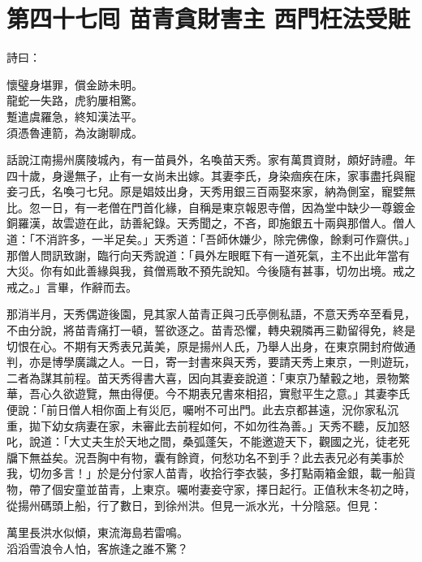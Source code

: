 
\chapter*{第四十七囘 苗青貪財害主 西門枉法受賍}


詩曰：

\begin{myquote}
懷璧身堪罪，償金跡未明。\\龍蛇一失路，虎豹屢相驚。\\蹔遣虞羅急，終知漢法平。\\須憑魯連箭，為汝謝聊成。
\end{myquote}

話說江南揚州廣陵城內，有一苗員外，名喚苗天秀。家有萬貫資財，頗好詩禮。年四十歲，身邊無子，止有一女尚未出嫁。其妻李氏，身染痼疾在床，家事盡托與寵妾刁氏，名喚刁七兒。原是娼妓出身，天秀用銀三百兩娶來家，納為側室，寵嬖無比。{}忽一日，有一老僧在門首化緣，自稱是東京報恩寺僧，因為堂中缺少一尊鍍金銅羅漢，故雲遊在此，訪善紀錄。天秀聞之，不吝，即施銀五十兩與那僧人。僧人道：「不消許多，一半足矣。」天秀道：「吾師休嫌少，除完佛像，餘剩可作齋供。」那僧人問訊致謝，臨行向天秀說道：「員外左眼眶下有一道死氣，主不出此年當有大災。你有如此善緣與我，貧僧焉敢不預先說知。今後隨有甚事，切勿出境。戒之戒之。」言畢，作辭而去。

那消半月，天秀偶遊後園，見其家人苗青正與刁氏亭側私語，不意天秀卒至看見，不由分說，將苗青痛打一頓，誓欲逐之。苗青恐懼，轉央親隣再三勸留得免，終是切恨在心。不期有天秀表兄黃美，原是揚州人氏，乃舉人出身，在東京開封府做通判，亦是博學廣識之人。一日，寄一封書來與天秀，要請天秀上東京，一則遊玩，二者為謀其前程。苗天秀得書大喜，因向其妻妾說道：「東京乃輦轂之地，景物繁華，吾心久欲遊覽，無由得便。今不期表兄書來相招，實慰平生之意。」其妻李氏便說：「前日僧人相你面上有災厄，囑咐不可出門。此去京都甚遠，況你家私沉重，拋下幼女病妻在家，未審此去前程如何，不如勿徃為善。」天秀不聽，反加怒叱，說道：「大丈夫生於天地之間，桑弧蓬矢，不能邀遊天下，觀國之光，徒老死牖下無益矣。況吾胸中有物，囊有餘資，何愁功名不到手？此去表兄必有美事於我，切勿多言！」於是分付家人苗青，收拾行李衣裝，多打點兩箱金銀，載一船貨物，帶了個安童並苗青，上東京。囑咐妻妾守家，擇日起行。正值秋末冬初之時，從揚州碼頭上船，行了數日，到徐州洪。但見一派水光，十分陰惡。但見：

\begin{myquote}
萬里長洪水似傾，東流海島若雷鳴。\\滔滔雪浪令人怕，客旅逢之誰不驚？
\end{myquote}

